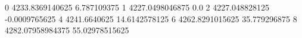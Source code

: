 0 4233.8369140625 6.787109375
1 4227.0498046875 0.0
2 4227.048828125 -0.0009765625
4 4241.6640625 14.6142578125
6 4262.8291015625 35.779296875
8 4282.07958984375 55.02978515625
